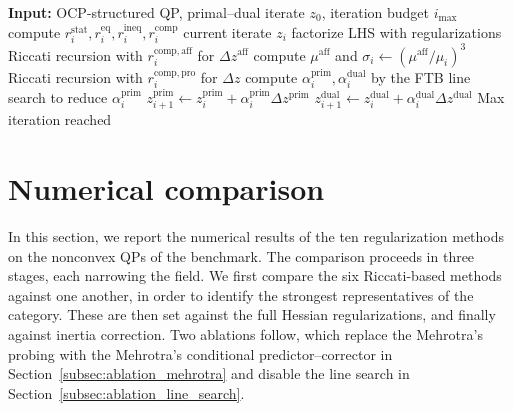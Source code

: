 \documentclass[class=scrbook, crop=false]{standalone}
\begin{document}
\begin{algorithm}[htbp]
\caption{Primal--dual \gls{IPM} implemented in the experiments}
\label{alg:ipm_experiment}
\begin{algorithmic}[1]
\State \textbf{Input:} \gls{OCP}-structured \gls{QP}, primal--dual iterate $z_0$, iteration budget $i_{\mathrm{max}}$
    \State compute $r_i^{\mathrm{stat}}, r_i^{\mathrm{eq}}, r_i^{\mathrm{ineq}}, r_i^{\mathrm{comp}}$
        \State \Return current iterate $z_i$
    \EndIf
    \State factorize \gls{LHS} with regularizations 
    \State Riccati recursion with $r_i^{\mathrm{comp},\mathrm{aff}}$ for $\Delta z^{\mathrm{aff}}$
    \State compute $\mu^{\mathrm{aff}}$ and $\sigma_i \gets (\mu^{\mathrm{aff}}/\mu_i)^3$  
    \State Riccati recursion with $r_i^{\mathrm{comp},\mathrm{pro}}$ for $\Delta z$
    \State compute $\alpha_i^{\mathrm{prim}}, \alpha_i^{\mathrm{dual}}$ by the \gls{FTB}
    \State line search to reduce $\alpha_i^{\mathrm{prim}}$ 
    \State $z_{i+1}^{\mathrm{prim}} \gets z_i^{\mathrm{prim}} + \alpha_i^{\mathrm{prim}} \Delta z^{\mathrm{prim}}$
    \State $z_{i+1}^{\mathrm{dual}} \gets z_i^{\mathrm{dual}} + \alpha_i^{\mathrm{dual}} \Delta z^{\mathrm{dual}}$
\EndFor
\State \Return Max iteration reached
\end{algorithmic}
\end{algorithm}

\section{Numerical comparison}
\label{sec:comparison}
In this section, we report the numerical results of the ten regularization methods on the nonconvex \glspl{QP} of the benchmark.
The comparison proceeds in three stages, each narrowing the field.
We first compare the six Riccati-based methods against one another, 
in order to identify the strongest representatives of the category. 
These are then set against the full Hessian regularizations, and finally against inertia correction.
Two ablations follow, which replace the Mehrotra's probing with the Mehrotra's conditional predictor--corrector
in Section~\ref{subsec:ablation_mehrotra} and disable the line search in Section~\ref{subsec:ablation_line_search}.
\end{document}
